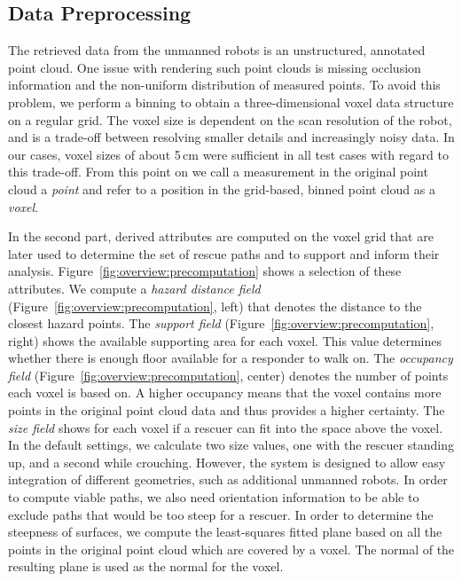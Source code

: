 \documentclass{egpubl}
\begin{document}
\subsection{Data Preprocessing} \label{sec:overview:preprocessing}
The retrieved data from the unmanned robots is an unstructured, annotated point cloud. One issue with rendering such point clouds is missing occlusion information and the non-uniform distribution of measured points. To avoid this problem, we perform a binning to obtain a three-dimensional voxel data structure on a regular grid. The voxel size is dependent on the scan resolution of the robot, and is a trade-off between resolving smaller details and increasingly noisy data. In our cases, voxel sizes of about 5\,cm were sufficient in all test cases with regard to this trade-off. From this point on we call a measurement in the original point cloud a \emph{point} and refer to a position in the grid-based, binned point cloud as a \emph{voxel}.

 In the second part, derived attributes are computed on the voxel grid that are later used to determine the set of rescue paths and to support and inform their analysis. Figure~\ref{fig:overview:precomputation} shows a selection of these attributes. We compute a \emph{hazard distance field} (Figure~\ref{fig:overview:precomputation}, left) that denotes the distance to the closest hazard points. The \emph{support field} (Figure~\ref{fig:overview:precomputation}, right) shows the available supporting area for each voxel. This value determines whether there is enough floor available for a responder to walk on. The \emph{occupancy field} (Figure~\ref{fig:overview:precomputation}, center) denotes the number of points each voxel is based on. A higher occupancy means that the voxel contains more points in the original point cloud data and thus provides a higher certainty. The \emph{size field} shows for each voxel if a rescuer can fit into the space above the voxel. In the default settings, we calculate two size values, one with the rescuer standing up, and a second while crouching. However, the system is designed to allow easy integration of different geometries, such as additional unmanned robots. In order to compute viable paths, we also need orientation information to be able to exclude paths that would be too steep for a rescuer. In order to determine the steepness of surfaces, we compute the least-squares fitted plane based on all the points in the original point cloud which are covered by a voxel. The normal of the resulting plane is used as the normal for the voxel.
\end{document}
